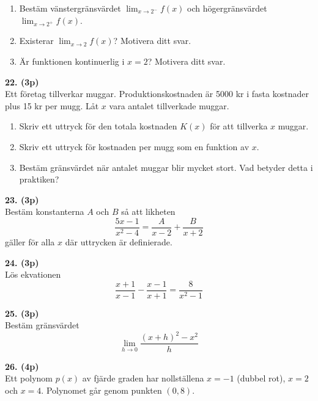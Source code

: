 \documentclass[12pt]{article}
\begin{document}
\begin{enumerate}[label=\alph*)]
    \item Bestäm vänstergränsvärdet $\lim_{x \to 2^-} f(x)$ och högergränsvärdet $\lim_{x \to 2^+} f(x)$.
    \item Existerar $\lim_{x \to 2} f(x)$? Motivera ditt svar.
    \item Är funktionen kontinuerlig i $x = 2$? Motivera ditt svar.
\end{enumerate}

\vspace{0.5cm}

\noindent
\textbf{22. (3p)} \\
Ett företag tillverkar muggar. Produktionskostnaden är 5000 kr i fasta kostnader plus 15 kr per mugg. Låt $x$ vara antalet tillverkade muggar.
\begin{enumerate}[label=\alph*)]
    \item Skriv ett uttryck för den totala kostnaden $K(x)$ för att tillverka $x$ muggar.
    \item Skriv ett uttryck för kostnaden per mugg som en funktion av $x$.
    \item Bestäm gränsvärdet när antalet muggar blir mycket stort. Vad betyder detta i praktiken?
\end{enumerate}

\vspace{0.5cm}


\noindent
\textbf{23. (3p)} \\
Bestäm konstanterna $A$ och $B$ så att likheten
\[
\frac{5x - 1}{x^2 - 4} = \frac{A}{x - 2} + \frac{B}{x + 2}
\]
gäller för alla $x$ där uttrycken är definierade.

\vspace{0.5cm}

\noindent
\textbf{24. (3p)} \\
Lös ekvationen
\[
\frac{x + 1}{x - 1} - \frac{x - 1}{x + 1} = \frac{8}{x^2 - 1}
\]

\vspace{0.5cm}

\noindent
\textbf{25. (3p)} \\
Bestäm gränsvärdet
\[
\lim_{h \to 0} \frac{(x + h)^2 - x^2}{h}
\]

\vspace{0.5cm}

\noindent
\textbf{26. (4p)} \\
Ett polynom $p(x)$ av fjärde graden har nollställena $x = -1$ (dubbel rot), $x = 2$ och $x = 4$. Polynomet går genom punkten $(0, 8)$.
\end{document}
